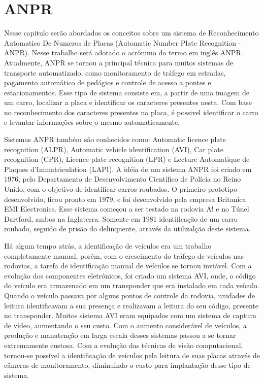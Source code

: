 
\usepackage{amssymb}

\chapter{ANPR}
\label{cap:anpr}

    Nesse capitulo serão abordados os conceitos sobre um sistema de Reconhecimento Automatico De Numeros de Placas (Automatic Number Plate Recognition - ANPR). Nesse trabalho será adotado o acrônimo do termo em inglês ANPR. Atualmente, ANPR se tornou a principal técnica para muitos sistemas de transporte automatizado, como monitoramento de tráfego em estradas, pagamento automático de pedágios e controle de acesso a pontes e estacionamentos. Esse tipo de sistema consiste em, a partir de uma imagem de um carro, localizar a placa e identificar os caracteres presentes nesta. Com base no reconhecimento dos caracteres presentes na placa, é possivel identificar o carro e levantar informações sobre o mesmo automaticamente.

    Sistemas ANPR também são conhecidos como: Automatic licence plate recognition (ALPR), Automatic vehicle identification (AVI), Car plate recognition (CPR), Licence plate recognition (LPR) e Lecture Automatique de Plaques d'Immatriculation (LAPI). A idéia de um sistema ANPR foi criado em 1976, pelo Departamento de Desenvolvimento Científico de Polícia no Reino Unido, com o objetivo de identificar carros roubados. O primeiro prototipo desenvolvido, ficou pronto em 1979, e foi desenvolvido pela empresa Britanica EMI Electronics. Esse sistema começou a ser testado na rodovia A! e no Túnel Dartford, ambos na Inglaterra. Somente em 1981 identificação de um carro roubado, seguido de prisão do delinquente, através da utilizalção deste sistema.

    Há algum tempo atrás, a identificação de veículos era um trabalho completamente manual, porém, com o crescimento do tráfego de veículos nas rodovias, a tarefa de identificação manual de veículos se tornou inviável. Com a evolução dos componentes eletrônicos, foi criado um sistema AVI, onde, o código do veículo era armazenado em um transponder que era instalado em cada veículo. Quando o veículo passava por alguns pontos de controle da rodovia, unidades de leitura identificavam a sua presença e realizavam a leitura do seu código, presente no transponder. Muitos sistema AVI eram equipados com um sistema de captura de vídeo, aumentando o seu custo. Com o aumento considerável de veículos, a produção e manutenção em larga escala desses sistemas passou a se tornar extremamente custosa. Com a evolução das técnicas de visão computacional, tornou-se possível a identificação de veículos pela leitura de suas placas através de câmeras de monitoramento, diminuindo o custo para implantação desse tipo de sistema.


